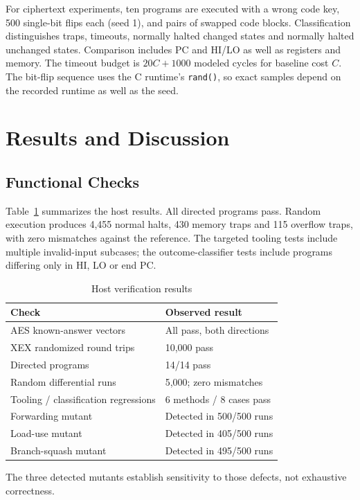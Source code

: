 \documentclass[conference,a4paper]{IEEEtran}
\begin{document}
For ciphertext experiments, ten programs are executed with a wrong code key,
500 single-bit flips each (seed 1), and pairs of swapped code blocks.
Classification distinguishes traps, timeouts, normally halted changed states
and normally halted unchanged states. Comparison includes PC and HI/LO as well
as registers and memory. The timeout budget is $20C+1000$ modeled cycles for
baseline cost $C$. The bit-flip sequence uses the C runtime's \texttt{rand()},
so exact samples depend on the recorded runtime as well as the seed.

\section{Results and Discussion}\label{sec:results}
\subsection{Functional Checks}
Table~\ref{tab:verification} summarizes the host results. All directed programs
pass. Random execution produces 4,455 normal halts, 430 memory traps and 115
overflow traps, with zero mismatches against the reference. The targeted
tooling tests include multiple invalid-input subcases; the outcome-classifier
tests include programs differing only in HI, LO or end PC.

\begin{table}[t]
\caption{Host verification results}
\label{tab:verification}
\centering
\small
\begin{tabular}{@{}ll@{}}
\toprule
Check & Observed result \\
\midrule
AES known-answer vectors & All pass, both directions \\
XEX randomized round trips & 10,000 pass \\
Directed programs & 14/14 pass \\
Random differential runs & 5,000; zero mismatches \\
Tooling / classification regressions & 6 methods / 8 cases pass \\
Forwarding mutant & Detected in 500/500 runs \\
Load-use mutant & Detected in 405/500 runs \\
Branch-squash mutant & Detected in 495/500 runs \\
\bottomrule
\end{tabular}
\end{table}

The three detected mutants establish sensitivity to those defects, not
exhaustive correctness.
\end{document}
